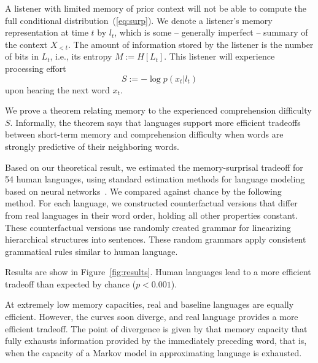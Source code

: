 \documentclass[11pt,letterpaper]{article}
\newcounter{theorem}
\begin{document}
A listener with limited memory of prior context will not be able to compute the full conditional distribution~(\ref{eq:surp}).
We denote a listener's memory representation at time $t$ by $l_t$, which is some -- generally imperfect -- summary of the context $X_{<t}$.
The amount of information stored by the listener is the number of bits in $L_t$, i.e., its entropy $M := H[L_t]$.
This listener will experience processing effort
\begin{equation}
	S :=	-\log p(x_t|l_t)
\end{equation}
upon hearing the next word $x_t$.

We prove a theorem relating memory to the experienced comprehension difficulty $S$.
Informally, the theorem says that languages support more efficient tradeoffs between short-term memory and comprehension difficulty when words are strongly predictive of their neighboring words.


Based on our theoretical result, we estimated the memory-surprisal tradeoff for 54 human languages, using standard estimation methods for language modeling based on neural networks~\citep{hochreiter-long-1997}.
We compared against chance by the following method.
For each language, we constructed counterfactual versions that differ from real languages in their word order, holding all other properties constant.
These counterfactual versions use randomly created grammar for linearizing hierarchical structures into sentences.
These random grammars apply consistent grammatical rules similar to human language.

Results are show in Figure~\ref{fig:results}.
Human languages lead to a more efficient tradeoff than expected by chance ($p < 0.001$).

At extremely low memory capacities, real and baseline languages are equally efficient.
However, the curves soon diverge, and real language provides a more efficient tradeoff.
The point of divergence is given by that memory capacity that fully exhausts information provided by the immediately preceding word, that is, when the capacity of a Markov model in approximating language is exhausted.
\end{document}
